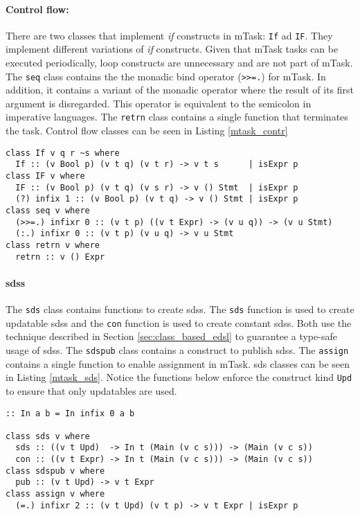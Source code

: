 \paragraph{Control flow:} There are two classes that implement \textit{if} constructs in mTask: \texttt{If} ad \texttt{IF}. They implement different variations of \textit{if} constructs. Given that mTask tasks can be executed periodically, loop constructs are unnecessary and are not part of mTask. The \texttt{seq} class contains the the monadic bind operator (\texttt{>>=.}) for mTask. In addition, it contains a variant of the monadic operator where the result of its first argument is disregarded. This operator is equivalent to the semicolon in imperative languages. The \texttt{retrn} class contains a single function that terminates the task. Control flow classes can be seen in Listing \ref{mtask_contr}

\begin{lstlisting}[caption=mTask control flow classes,captionpos=b,label=mtask_contr]
class If v q r ~s where
  If :: (v Bool p) (v t q) (v t r) -> v t s      | isExpr p 
class IF v where
  IF :: (v Bool p) (v t q) (v s r) -> v () Stmt  | isExpr p
  (?) infix 1 :: (v Bool p) (v t q) -> v () Stmt | isExpr p
class seq v where
  (>>=.) infixr 0 :: (v t p) ((v t Expr) -> (v u q)) -> (v u Stmt) 
  (:.) infixr 0 :: (v t p) (v u q) -> v u Stmt 
class retrn v where
  retrn :: v () Expr
\end{lstlisting}

\paragraph{\aclp{sds}} The \texttt{sds} class contains functions to create \aclp{sds}. The \texttt{sds} function is used to create updatable \acp{sds} and the \texttt{con} function is used to create constant \acp{sds}. Both use the technique described in Section \ref{sec:class_based_edsl} to guarantee a type-safe usage of \acp{sds}. The \texttt{sdspub} class contains a construct to publish \acp{sds}. The \texttt{assign} contains a single function to enable assignment in mTask. \ac{sds} classes can be seen in Listing \ref{mtask_sds}. Notice the functions below enforce the construct kind \texttt{Upd} to ensure that only updatables are used.

\begin{lstlisting}[caption=mTask SDS classes,captionpos=b,label=mtask_sds]
:: In a b = In infix 0 a b

class sds v where
  sds :: ((v t Upd)  -> In t (Main (v c s))) -> (Main (v c s))
  con :: ((v t Expr) -> In t (Main (v c s))) -> (Main (v c s)) 
class sdspub v where
  pub :: (v t Upd) -> v t Expr
class assign v where
  (=.) infixr 2 :: (v t Upd) (v t p) -> v t Expr | isExpr p
\end{lstlisting}

